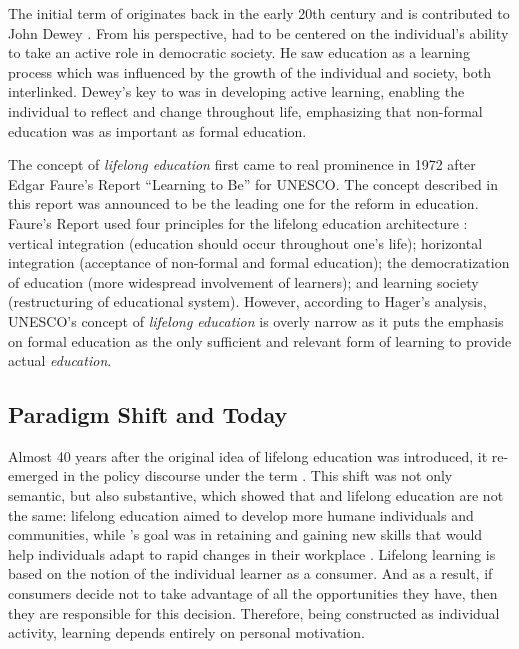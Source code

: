 The initial term of \textit{\LLLsn} originates back in the early 20th century
and is contributed to John Dewey \citeyearpar{Dewey2004}. From his
perspective, \LLLs had to be centered on the individual's ability to take an
active role in democratic society. He saw education as a learning process which
was influenced by the growth of the individual and society, both interlinked.
Dewey's key to \LLLs was in developing active learning, enabling the individual
to reflect and change throughout life, emphasizing that non-formal education was
as important as formal education.

The concept of \textit{lifelong education} first came to real prominence in 1972
after Edgar Faure's Report ``Learning to Be'' for UNESCO. The concept described
in this report was announced to be the leading one for the reform in education.
Faure's Report used four principles for the lifelong education architecture
\citep{Faure1972}: vertical integration (education should occur throughout one's
life); horizontal integration (acceptance of non-formal and formal education);
the democratization of education (more widespread involvement of learners); and
learning society (restructuring of educational system). However, according to
Hager's \citeyearpar{Hager2011} analysis, UNESCO's concept of \textit{lifelong
education} is overly narrow as it puts the emphasis on formal education as the
only sufficient and relevant form of learning to provide actual
\textit{education}.

\subsection{Paradigm Shift and \LLLc Today}

Almost 40 years after the original idea of lifelong education was introduced, 
it re-emerged in the policy discourse under the term \LLLs \citep{Boshier2000}.
This shift was not only semantic, but also substantive, which showed that \LLLs
and lifelong education are not the same: lifelong education aimed to develop
more humane individuals and communities, while \LLLsn's goal was in retaining
and gaining new skills that would help individuals adapt to rapid changes in
their workplace \citep{Medel-Anonuevo2001}. Lifelong learning is based on the
notion of the individual learner as a consumer. And as a result, if consumers
decide not to take advantage of all the opportunities they have, then they are
responsible for this decision. Therefore, being constructed as individual
activity, learning depends entirely on personal motivation.

